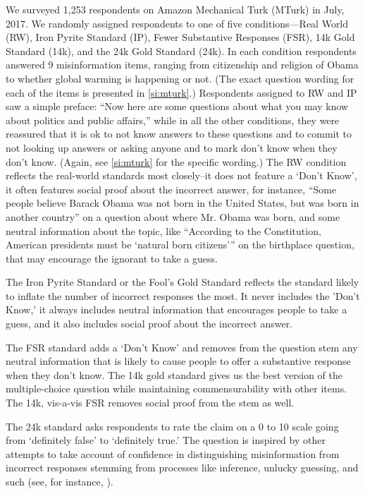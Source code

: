 \documentclass[12pt, letterpaper]{article}
\begin{document}
We surveyed 1,253 respondents on Amazon Mechanical Turk (MTurk) in July, 2017. We randomly assigned respondents to one of five conditions—Real World (RW), Iron Pyrite Standard (IP), Fewer Substantive Responses (FSR), 14k Gold Standard (14k), and the 24k Gold Standard (24k). In each condition respondents answered 9 misinformation items, ranging from citizenship and religion of Obama to whether global warming is happening or not. (The exact question wording for each of the items is presented in \cref{si:mturk}.) Respondents assigned to RW and IP saw a simple preface: ``Now here are some questions about what you may know about politics and public affairs,'' while in all the other conditions, they were reassured that it is ok to not know answers to these questions and to commit to not looking up answers or asking anyone and to mark don't know when they don’t know. (Again, see \cref{si:mturk} for the specific wording.)
The RW condition reflects the real-world standards most closely--it does not feature a `Don't Know', it often features social proof about the incorrect answer, for instance, ``Some people believe Barack Obama was not born in the United States, but was born in another country'' on a question about where Mr. Obama was born, and some neutral information about the topic, like ``According to the Constitution, American presidents must be `natural born citizens''' on the birthplace question, that may encourage the ignorant to take a guess.

The Iron Pyrite Standard or the Fool's Gold Standard reflects the standard likely to inflate the number of incorrect responses the most. It never includes the 'Don't Know,' it always includes neutral information that encourages people to take a guess, and it also includes social proof about the incorrect answer.

The FSR standard adds a `Don't Know’ and removes from the question stem any neutral information that is likely to cause people to offer a substantive response when they don't know. The 14k gold standard gives us the best version of the multiple-choice question while maintaining commensurability with other items. The 14k, vis-a-vis FSR removes social proof from the stem as well.

The 24k standard asks respondents to rate the claim on a 0 to 10 scale going from `definitely false' to `definitely true.' The question is inspired by other attempts to take account of confidence in distinguishing misinformation from incorrect responses stemming from processes like inference, unlucky guessing, and such (see, for instance, \citep{pasek2015}).
\end{document}
